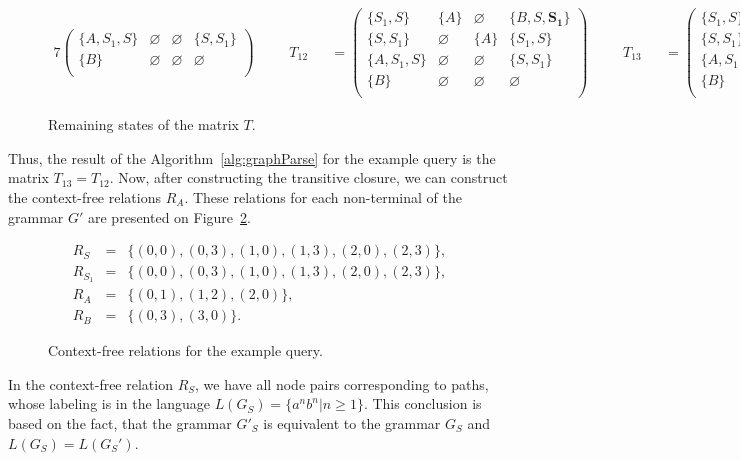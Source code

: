\begin{figure}[ht]
\begin{alignat*}{7}
\begin{pmatrix}
\{A, S_1, S\}  & \varnothing & \varnothing & \{S, S_1\} \\
\{B\}       & \varnothing & \varnothing & \varnothing \\
\end{pmatrix} \ \ \ \ &&T_{12} &&= \begin{pmatrix}
\{S_1, S\}     & \{A\}       & \varnothing & \{B, S, \pmb{S_1}\}    \\
\{S, S_1\}       & \varnothing & \{A\}       & \{S_1, S\}     \\
\{A, S_1, S\}  & \varnothing & \varnothing & \{S, S_1\} \\
\{B\}       & \varnothing & \varnothing & \varnothing \\
\end{pmatrix} \ \ \ \ &&T_{13} &&= \begin{pmatrix}
\{S_1, S\}     & \{A\}       & \varnothing & \{B, S, S_1\}    \\
\{S, S_1\}       & \varnothing & \{A\}       & \{S_1, S\}     \\
\{A, S_1, S\}  & \varnothing & \varnothing & \{S, S_1\} \\
\{B\}       & \varnothing & \varnothing & \varnothing \\
\end{pmatrix}
\end{alignat*}
\caption{Remaining states of the matrix $T$.}
\label{ExampleQueryFinalIterations}
\end{figure}

Thus, the result of the Algorithm~\ref{alg:graphParse} for the example query is the matrix $T_{13} = T_{12}$. Now, after constructing the transitive closure, we can construct the context-free relations $R_A$. These relations for each non-terminal of the grammar $G'$ are presented on Figure~\ref{ExampleQueryCFRelations}.

\begin{figure}[h]
\begin{eqnarray*}
R_S&=&\{(0,0),(0,3),(1,0),(1,3),(2,0),(2,3)\},\\
R_{S_1}&=&\{(0,0),(0,3),(1,0),(1,3),(2,0),(2,3)\},\\
R_{A}&=&\{(0,1),(1,2),(2,0)\}, \\
R_{B}&=&\{(0,3), (3,0)\}.
\end{eqnarray*}
\caption{Context-free relations for the example query.}
\label{ExampleQueryCFRelations}
\end{figure}

In the context-free relation $R_S$, we have all node pairs corresponding to paths, whose labeling is in the language $L(G_S) = \{a^n b^n| n \geq 1\}$. This conclusion is based on the fact, that the grammar $G'_S$ is equivalent to the grammar $G_S$ and $L(G_S) = L(G_S')$.
